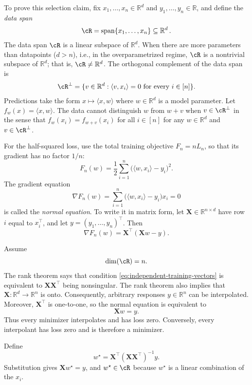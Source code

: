 \documentclass[11pt,twoside]{article}
\newcommand{\R}{\mathbb R}
\theoremstyle{definition}
\theoremstyle{remark}
\begin{document}
To prove this selection claim, fix $x_1,\ldots,x_n\in\R^d$ and
$y_1,\ldots,y_n\in\R$, and define the
\emph{data span}
\[
 \cR=\operatorname{span}\{x_1,\ldots,x_n\}\subseteq\R^d\,.
\]
The data span $\cR$ is a linear subspace of $\R^d$. When there are more
parameters than datapoints ($d>n$), i.e., in the overparametrized regime,
$\cR$ is a nontrivial subspace of $\R^d$; that is, $\cR\ne\R^d$.
The orthogonal complement of the data span is
\[
 \cR^\perp=\{v\in\R^d:\langle v,x_i\rangle=0
                       \text{ for every }i\in[n]\}.
\]
Predictions take the form $x \mapsto \langle x, w \rangle$ where $w\in \R^d$ is
a model parameter. Let $f_w(x) = \langle x, w \rangle$.
The data cannot distinguish $w$ from $w+v$ when $v\in\cR^\perp$ in the sense
that $f_w(x_i)= f_{w+v}(x_i)$ for all $i\in [n]$ for any $w\in \R^d$ and $v\in \cR^\perp$.

For the half-squared loss, use the total training objective
\(F_n=nL_n\), so that its gradient has no factor \(1/n\):
\begin{equation}
 F_n(w)=\frac12\sum_{i=1}^n
          \bigl(\langle w,x_i\rangle-y_i\bigr)^2.
 \label{eq:least-squares-loss}
\end{equation}
The gradient equation
\begin{equation}
 \nabla F_n(w)
 =\sum_{i=1}^n\bigl(\langle w,x_i\rangle-y_i\bigr)x_i=0
 \label{eq:normal-equation-sum}
\end{equation}
is called the \emph{normal equation}. To write it in matrix form, let
$\mathbf X\in\R^{n\times d}$ have row $i$ equal to $x_i^\top$, and let
$y=(y_1,\ldots,y_n)^\top$. Then
\[
 \nabla F_n(w)=\mathbf X^\top(\mathbf Xw-y).
\]

Assume
\begin{equation}
 \dim(\cR)=n.
 \label{eq:independent-training-vectors}
\end{equation}
The rank theorem says that condition
\cref{eq:independent-training-vectors} is equivalent to
$\mathbf X\mathbf X^\top$ being nonsingular. The rank theorem also implies
that
$\mathbf X:\R^d\to\R^n$ is onto. Consequently, arbitrary responses
$y\in\R^n$ can be interpolated. Moreover, $\mathbf X^\top$ is one-to-one,
so the normal equation is equivalent to
\begin{equation}
 \mathbf Xw=y.
 \label{eq:least-squares-interpolation}
\end{equation}
Thus every minimizer interpolates and has loss zero. Conversely, every
interpolant has loss zero and is therefore a minimizer.

Define
\begin{equation}
 w^\star=\mathbf X^\top
          (\mathbf X\mathbf X^\top)^{-1}y.
 \label{eq:least-squares-minimum-norm}
\end{equation}
Substitution gives $\mathbf Xw^\star=y$, and $w^\star\in\cR$ because $w^\star$ is
a linear combination of the $x_i$.
\end{document}
